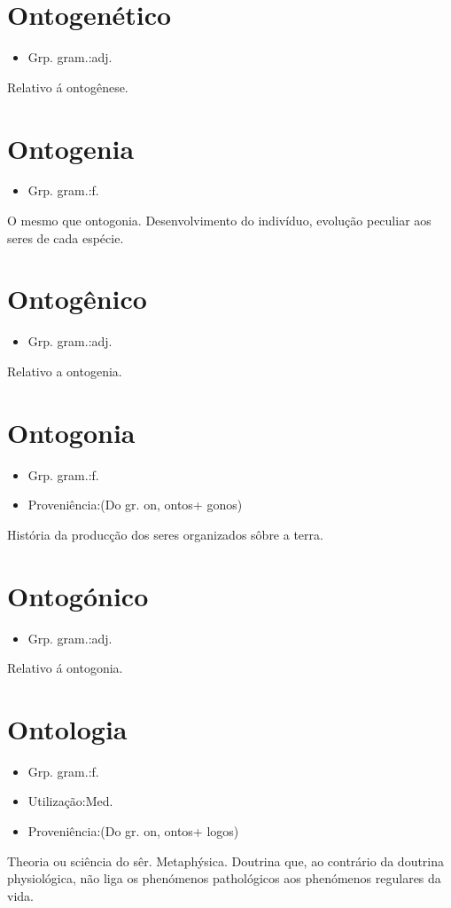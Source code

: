 \section{Ontogenético}
\begin{itemize}
\item {Grp. gram.:adj.}
\end{itemize}
Relativo á ontogênese.
\section{Ontogenia}
\begin{itemize}
\item {Grp. gram.:f.}
\end{itemize}
O mesmo que \textunderscore ontogonia\textunderscore .
Desenvolvimento do indivíduo, evolução peculiar aos seres de cada espécie.
\section{Ontogênico}
\begin{itemize}
\item {Grp. gram.:adj.}
\end{itemize}
Relativo a \textunderscore ontogenia\textunderscore .
\section{Ontogonia}
\begin{itemize}
\item {Grp. gram.:f.}
\end{itemize}
\begin{itemize}
\item {Proveniência:(Do gr. \textunderscore on\textunderscore , \textunderscore ontos\textunderscore  + \textunderscore gonos\textunderscore )}
\end{itemize}
História da producção dos seres organizados sôbre a terra.
\section{Ontogónico}
\begin{itemize}
\item {Grp. gram.:adj.}
\end{itemize}
Relativo á ontogonia.
\section{Ontologia}
\begin{itemize}
\item {Grp. gram.:f.}
\end{itemize}
\begin{itemize}
\item {Utilização:Med.}
\end{itemize}
\begin{itemize}
\item {Proveniência:(Do gr. \textunderscore on\textunderscore , \textunderscore ontos\textunderscore  + \textunderscore logos\textunderscore )}
\end{itemize}
Theoria ou sciência do sêr.
Metaphýsica.
Doutrina que, ao contrário da doutrina physiológica, não liga os phenómenos pathológicos aos phenómenos regulares da vida.
